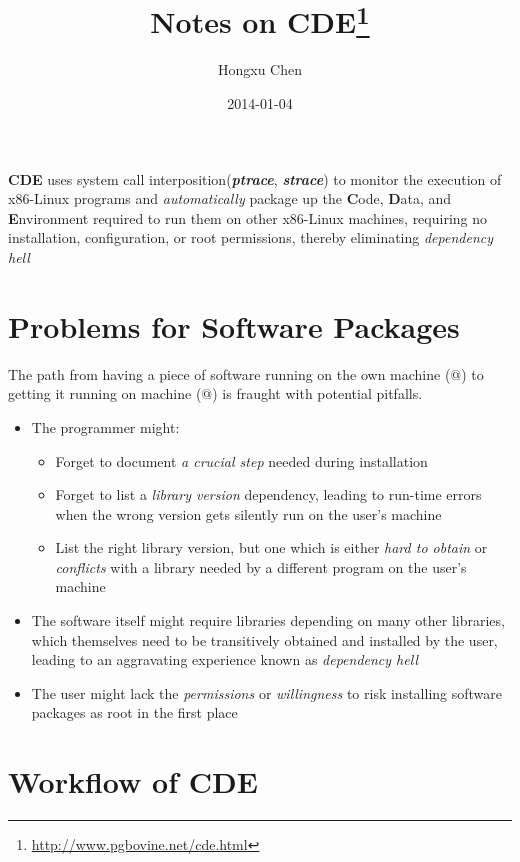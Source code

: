 \documentclass{report}
\title{\textbf{Notes on CDE\footnote{\url{http://www.pgbovine.net/cde.html}}}}
\author{Hongxu Chen}
\date{2014-01-04}
\makeatletter
\newcommand*{\rom}[1]{\expandafter\@slowromancap\romannumeral #1@}
\makeatother
\begin{document}
\maketitle

\textbf{CDE} uses system call interposition(\textsl{\textbf{ptrace}}, \textsl{\textbf{strace}}) to
monitor the execution of x86-Linux programs and \emph{automatically} package up
the \textbf{C}ode, \textbf{D}ata, and \textbf{E}nvironment required to run them
on other x86-Linux machines, requiring no \textmd{installation},
\textmd{configuration}, or \textmd{root permissions}, thereby eliminating
\textsl{dependency hell}

\section{Problems for Software Packages}
The path from having a piece of software running on the own machine (\rom{1}) to
getting it running on machine (\rom{2}) is fraught with potential pitfalls.\\
\begin{itemize}
\item The programmer might:
  \begin{itemize}
  \item Forget to document \textsl{a crucial step} needed during installation
  \item Forget to list a \textsl{library version} dependency, leading to run-time errors when the wrong version gets silently run on the user’s machine
  \item List the right library version, but one which is either \textsl{hard to obtain} or \textsl{conflicts} with a library needed by a different program on the user’s machine
  \end{itemize}
\item The software itself might require libraries depending on many other libraries, which themselves need to be transitively obtained and installed by the user, leading to an aggravating experience known as \textsl{dependency hell}
\item The user might lack the \textsl{permissions} or \textsl{willingness} to risk installing software packages as root in the first place
\end{itemize}

\section{Workflow of CDE}
\end{document}

